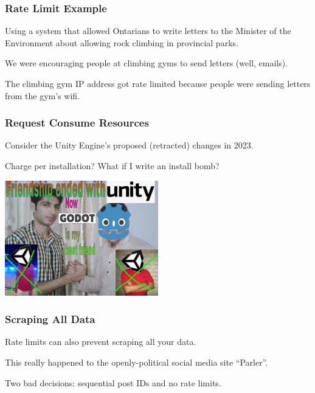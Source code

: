 \begin{frame}
\frametitle{Rate Limit Example}

Using a system that allowed Ontarians to write letters to the Minister of the Environment about allowing rock climbing in provincial parks. 

We were encouraging people at climbing gyms to send letters (well, emails).

The climbing gym IP address got rate limited because people were sending letters from the gym's wifi.

\end{frame}

\begin{frame}
\frametitle{Request Consume Resources}

Consider the Unity Engine's proposed (retracted) changes in 2023.

Charge per installation? What if I write an install bomb?

\begin{center}
  \includegraphics[width=0.5\textwidth]{images/unityengine.jpg}
\end{center}

\end{frame}

\begin{frame}
\frametitle{Scraping All Data}

Rate limits can also prevent scraping all your data.

This really happened to the openly-political social media site ``Parler''.

Two bad decisions: sequential post IDs and no rate limits.

\end{frame}

